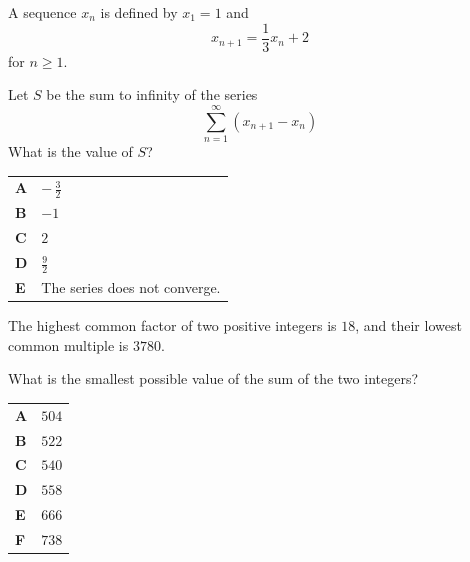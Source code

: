 \documentclass[11pt,a4paper]{article}
\begin{document}
\clearpage
\thispagestyle{djspaper}
\vspace*{8pt}
\begin{enumerate}[label=\textbf{\arabic*.},leftmargin=*,itemsep=0pt,start=18]
A sequence $x_n$ is defined by $x_1=1$ and \[x_{n+1}=\frac{1}{3}x_n+2\] for $n\ge 1$.

Let $S$ be the sum to infinity of the series \[ \sum_{n=1}^{\infty} \left(x_{n+1}-x_n\right) \] What is the value of $S$?

\par\vspace*{12pt}
\begin{tabularx}{\linewidth}{@{}>{\bfseries}l Y@{}}
A &
$-\,\frac{3}{2}$
\\[0.8em]
B &
$-1$
\\[0.8em]
C &
$2$
\\[0.8em]
D &
$\frac{9}{2}$
\\[0.8em]
E &
The series does not converge.
\\
\end{tabularx}
\end{enumerate}
\clearpage
\thispagestyle{djspaper}
\vspace*{8pt}
\begin{enumerate}[label=\textbf{\arabic*.},leftmargin=*,itemsep=0pt,start=19]
\questionitem[Number]
The highest common factor of two positive integers is $18$, and their lowest common multiple is $3780$.

What is the smallest possible value of the sum of the two integers?

\par\vspace*{12pt}
\begin{tabularx}{\linewidth}{@{}>{\bfseries}l Y@{}}
A &
$504$
\\[0.8em]
B &
$522$
\\[0.8em]
C &
$540$
\\[0.8em]
D &
$558$
\\[0.8em]
E &
$666$
\\[0.8em]
F &
$738$
\\
\end{tabularx}
\end{enumerate}
\end{document}

